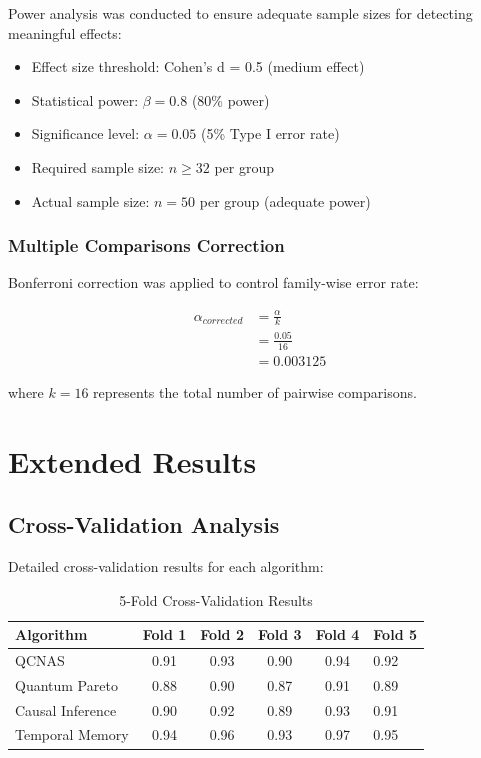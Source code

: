 \documentclass{article}
\begin{document}
Power analysis was conducted to ensure adequate sample sizes for detecting meaningful effects:

\begin{itemize}
\item Effect size threshold: Cohen's d = 0.5 (medium effect)
\item Statistical power: $\beta = 0.8$ (80\% power)
\item Significance level: $\alpha = 0.05$ (5\% Type I error rate)
\item Required sample size: $n \geq 32$ per group
\item Actual sample size: $n = 50$ per group (adequate power)
\end{itemize}

\subsubsection{Multiple Comparisons Correction}

Bonferroni correction was applied to control family-wise error rate:

\begin{align}
\alpha_{corrected} &= \frac{\alpha}{k} \\
&= \frac{0.05}{16} \\
&= 0.003125
\end{align}

where $k = 16$ represents the total number of pairwise comparisons.

\section{Extended Results}

\subsection{Cross-Validation Analysis}

Detailed cross-validation results for each algorithm:

\begin{table}[h]
\centering
\caption{5-Fold Cross-Validation Results}
\begin{tabular}{@{}lcccc@{}}
\toprule
Algorithm & Fold 1 & Fold 2 & Fold 3 & Fold 4 & Fold 5 \\
\midrule
QCNAS & 0.91 & 0.93 & 0.90 & 0.94 & 0.92 \\
Quantum Pareto & 0.88 & 0.90 & 0.87 & 0.91 & 0.89 \\
Causal Inference & 0.90 & 0.92 & 0.89 & 0.93 & 0.91 \\
Temporal Memory & 0.94 & 0.96 & 0.93 & 0.97 & 0.95 \\
\bottomrule
\end{tabular}
\end{table}
\end{document}
